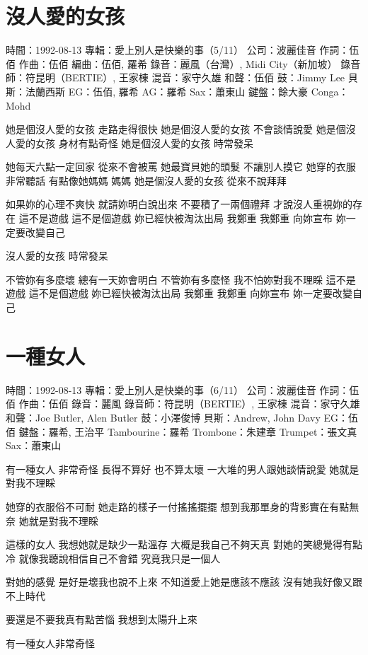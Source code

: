 \documentclass[UTF8,a4paper,oneside,twocolumn,12pt]{ctexbook}
\newcommand{\infopair}[2]{\textbullet #1：#2}
\newcommand{\zc}[1][伍佰]{\infopair{作詞}{#1}}
\newcommand{\zq}[1][伍佰]{\infopair{作曲}{#1}}
\newcommand{\bq}[1][伍佰]{\infopair{編曲}{#1}}
\newcommand{\zj}[1]{\infopair{專輯}{#1}}
\newcommand{\sj}[1]{\infopair{時間}{#1}}
\newcommand{\gs}[1]{\infopair{公司}{#1}}
\newenvironment{info}{\begin{flushleft}\kaishu
	}
	{\end{flushleft}\normalsize\yahei\par}
\newenvironment{lyric}{
	}
{}
\begin{document}
\section{沒人愛的女孩}
\begin{info}
	\sj{1992-08-13}
	\zj{愛上別人是快樂的事（5/11）}
	\gs{波麗佳音}
	\zc
	\zq
	\bq[伍佰, 羅希]
	\infopair{錄音}{麗風（台灣）, Midi City（新加坡）}
	\infopair{錄音師}{符昆明（BERTIE）, 王家棟}
	\infopair{混音}{家守久雄}
	\infopair{和聲}{伍佰}
	\infopair{鼓}{Jimmy Lee}
	\infopair{貝斯}{法蘭西斯}
	\infopair{EG}{伍佰, 羅希}
	\infopair{AG}{羅希}
	\infopair{Sax}{蕭東山}
	\infopair{鍵盤}{餘大豪}
	\infopair{Conga}{Mohd}
\end{info}
\begin{lyric}
	她是個沒人愛的女孩 走路走得很快
	她是個沒人愛的女孩 不會談情說愛
	她是個沒人愛的女孩 身材有點奇怪
	她是個沒人愛的女孩 時常發呆

	她每天六點一定回家 從來不會被罵
	她最寶貝她的頭髮   不讓別人摸它
	她穿的衣服非常聽話 有點像她媽媽  媽媽
	她是個沒人愛的女孩 從來不說拜拜

	如果妳的心理不爽快 就請妳明白說出來
	不要積了一兩個禮拜 才說沒人重視妳的存在
	這不是遊戲  這不是個遊戲  妳已經快被淘汰出局
	我鄭重  我鄭重  向妳宣布  妳一定要改變自己

	沒人愛的女孩  時常發呆

	不管妳有多麼壞  總有一天妳會明白
	不管妳有多麼怪  我不怕妳對我不理睬
	這不是遊戲  這不是個遊戲  妳已經快被淘汰出局
	我鄭重  我鄭重  向妳宣布  妳一定要改變自己
\end{lyric}

\section{一種女人}
\begin{info}
	\sj{1992-08-13}
	\zj{愛上別人是快樂的事（6/11）}
	\gs{波麗佳音}
	\zc
	\zq
	\infopair{錄音}{麗風}
	\infopair{錄音師}{符昆明（BERTIE）, 王家棟}
	\infopair{混音}{家守久雄}
	\infopair{和聲}{Joe Butler, Alen Butler}
	\infopair{鼓}{小澤俊博}
	\infopair{貝斯}{Andrew, John Davy}
	\infopair{EG}{伍佰}
	\infopair{鍵盤}{羅希, 王治平}
	\infopair{Tambourine}{羅希}
	\infopair{Trombone}{朱建章}
	\infopair{Trumpet}{張文真}
	\infopair{Sax}{蕭東山}
\end{info}
\begin{lyric}
	有一種女人   非常奇怪
	長得不算好   也不算太壞
	一大堆的男人跟她談情說愛
	她就是對我不理睬

	她穿的衣服俗不可耐
	她走路的樣子一付搖搖擺擺
	想到我那單身的背影實在有點無奈
	她就是對我不理睬

	這樣的女人  我想她就是缺少一點溫存
	大概是我自己不夠天真
	對她的笑總覺得有點冷
	就像我聽說相信自己不會錯
	究竟我只是一個人

	對她的感覺  是好是壞我也說不上來
	不知道愛上她是應該不應該
	沒有她我好像又跟不上時代

	要還是不要我真有點苦惱
	我想到太陽升上來

	有一種女人非常奇怪
\end{lyric}
\end{document}
